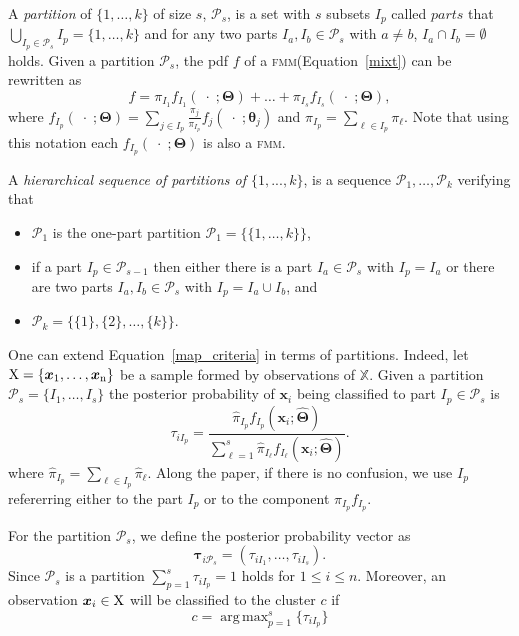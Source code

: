 \documentclass[submit]{smj}
\DeclareMathOperator*{\argmax}{arg\,max}
\theoremstyle{definition}
\newcommand{\m}[1]{\boldsymbol{#1}}
\newcommand{\fmm}{\textsc{fmm}\xspace}
\begin{document}
%
A \emph{partition} of $\{1, \dots, k\}$ of size $s$, $\mathcal{P}_s$,  is a set with $s$ subsets $I_p$ called $parts$ that $\bigcup_{I_p \in \mathcal{P}_s} I_p = \{1, \dots, k\}$ and for any two parts $I_a, I_b \in \mathcal{P}_s$ with $a \neq b$, $I_a \cap I_b = \emptyset$ holds. Given a partition  $\mathcal{P}_s$, the pdf $f$ of a \fmm (Equation~\ref{mixt}) can be rewritten as
\begin{equation}
f = \pi_{I_1} f_{I_1}(\;\cdot\;; \m\Theta) + \dots + \pi_{I_s} f_{I_s}(\;\cdot\;; \m\Theta),
\label{mixt_part}
\end{equation}
where $f_{I_p}(\;\cdot\;;  \m\Theta) = \sum_{j \in I_p} \frac{\pi_j}{\pi_{I_p}} f_j(\;\cdot\; ; \m\theta_j)$ and $\pi_{I_p} = \sum_{\ell \in I_p} \pi_\ell$. Note that using this notation each $f_{I_p}(\;\cdot\;;  \m\Theta)$ is also a \fmm.



A \emph{hierarchical sequence of partitions of $\{1,...,k\}$}, is a sequence $\mathcal{P}_1, \dots, \mathcal{P}_k$ verifying that
\begin{itemize}
\item $\mathcal{P}_1$ is the one-part partition $\mathcal{P}_1 = \{ \{1, \dots, k\} \}$,
\item if a part $I_p \in \mathcal{P}_{s-1}$ then either there is a part $I_a \in \mathcal{P}_{s}$ with $I_p = I_a$ or there are two parts $I_a, I_b \in \mathcal{P}_s$ with $I_p = I_a \cup I_b$, and
\item $\mathcal{P}_k= \{ \{1\},\{2\}, \dots, \{k\} \}$.
\end{itemize}



One can extend Equation~\ref{map_criteria} in terms of partitions. Indeed, let $\rm X = \{\m x_1,\dots, \m x_n\}$ be a sample formed by observations of $\mathbb{X}$. Given a partition $\mathcal{P}_s = \{ I_1, \dots, I_s \}$ the posterior probability of $\m x_i$ being classified to part $I_p\in \mathcal{P}_{s}$ is
\[
\tau_{i I_p} =  \frac{ \hat{\pi}_{I_p} f_{I_p}(\m x_i; \hat{\m\Theta}) }{\sum_{\ell=1}^s \hat{\pi}_{I_\ell} f_{I_\ell}(\m x_i; \hat{\m\Theta})}.
\]
where $\hat{\pi}_{I_p} = \sum_{\ell \in I_p} \hat{\pi}_\ell$. Along the paper, if there is no confusion, we use $I_p$ refererring either to the part $I_p$ or to the component $\pi_{I_p} f_{I_p}$.

For the partition  $\mathcal{P}_s$, we define the posterior probability vector as
\begin{equation}\label{ppv}
\m\tau_{i \mathcal{P}_s} = \left(\tau_{i I_1} , \dots, \tau_{i I_s}  \right).
\end{equation}
Since $\mathcal{P}_s$ is a partition $\sum_{p=1}^s \tau_{i I_p} = 1$ holds  for $1 \leq i \leq n$.
Moreover, an observation $\m x_i \in \rm X$ will be classified to the cluster $c$ if
\begin{equation}\label{cluster_criteria}
c= \argmax_{p=1}^s \{ \tau_{i I_p} \}
\end{equation}
\end{document}
